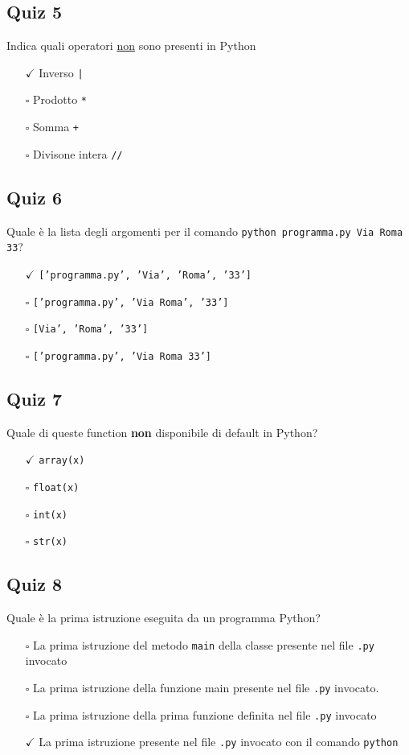 \documentclass{article}
\begin{document}
\subsection*{Quiz 5}
Indica quali operatori \underline{non} sono presenti in Python
\begin{itemize}
  \item[$\checkmark$] Inverso \texttt{|}
  \item[$\square$] Prodotto \texttt{*}
  \item[$\square$] Somma \texttt{+}
  \item[$\square$] Divisone intera \texttt{//}
\end{itemize}
\subsection*{Quiz 6}
Quale è la lista degli argomenti per il comando \texttt{python programma.py Via Roma 33}?
\begin{itemize}
  \item[$\checkmark$] \texttt{['programma.py', 'Via', 'Roma', '33']}
  \item[$\square$] \texttt{['programma.py', 'Via Roma', '33']}
  \item[$\square$] \texttt{[Via', 'Roma', '33']}
  \item[$\square$] \texttt{['programma.py', 'Via Roma 33']}
\end{itemize}
\subsection*{Quiz 7}
Quale di queste function \textbf{non} disponibile di default in Python?
\begin{itemize}
  \item[$\checkmark$] \texttt{array(x)}
  \item[$\square$] \texttt{float(x)}
  \item[$\square$] \texttt{int(x)}
  \item[$\square$] \texttt{str(x)}
\end{itemize}
\subsection*{Quiz 8}
Quale è la prima istruzione eseguita da un programma Python?
\begin{itemize}
  \item[$\square$] La prima istruzione del metodo \texttt{main} della classe presente nel file \texttt{.py} invocato
  \item[$\square$] La prima istruzione della funzione main presente nel file \texttt{.py} invocato.
  \item[$\square$] La prima istruzione della prima funzione definita nel file \texttt{.py} invocato
  \item[$\checkmark$] La prima istruzione presente nel file \texttt{.py} invocato con il comando \texttt{python}
\end{itemize}
\end{document}
